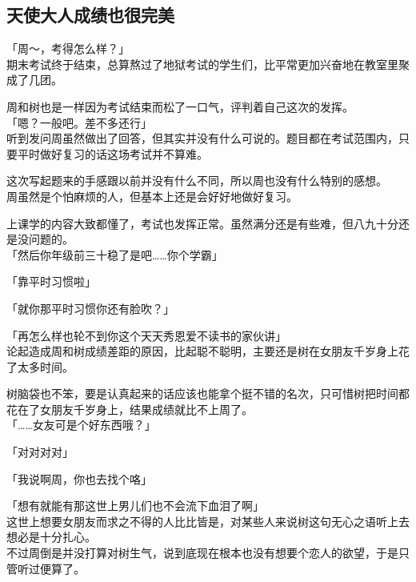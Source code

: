 \subsection{天使大人成绩也很完美}

「周～，考得怎么样？」\\

期末考试终于结束，总算熬过了地狱考试的学生们，比平常更加兴奋地在教室里聚成了几团。

周和树也是一样因为考试结束而松了一口气，评判着自己这次的发挥。\\

「嗯？一般吧。差不多还行」\\

听到发问周虽然做出了回答，但其实并没有什么可说的。题目都在考试范围内，只要平时做好复习的话这场考试并不算难。

这次写起题来的手感跟以前并没有什么不同，所以周也没有什么特别的感想。\\

周虽然是个怕麻烦的人，但基本上还是会好好地做好复习。

上课学的内容大致都懂了，考试也发挥正常。虽然满分还是有些难，但八九十分还是没问题的。\\

「然后你年级前三十稳了是吧……你个学霸」

「靠平时习惯啦」

「就你那平时习惯你还有脸吹？」

「再怎么样也轮不到你这个天天秀恩爱不读书的家伙讲」\\

论起造成周和树成绩差距的原因，比起聪不聪明，主要还是树在女朋友千岁身上花了太多时间。

树脑袋也不笨，要是认真起来的话应该也能拿个挺不错的名次，只可惜树把时间都花在了女朋友千岁身上，结果成绩就比不上周了。\\

「……女友可是个好东西哦？」

「对对对对」

「我说啊周，你也去找个咯」

「想有就能有那这世上男儿们也不会流下血泪了啊」\\

这世上想要女朋友而求之不得的人比比皆是，对某些人来说树这句无心之语听上去想必是十分扎心。\\

不过周倒是并没打算对树生气，说到底现在根本也没有想要个恋人的欲望，于是只管听过便算了。\\

